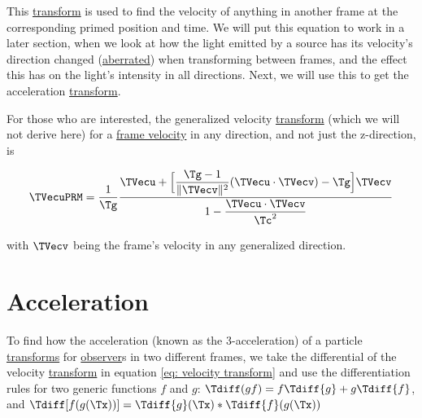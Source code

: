 This \hyperlink{def-transform}{transform} is used to find the velocity of anything in another frame at the corresponding primed position and time.
We will put this equation to work in a later section, when we look at how the light emitted by a source has its velocity's direction changed (\hyperlink{def-aberration}{aberrated}) when transforming between frames, and the effect this has on the light's intensity in all directions.
Next, we will use this to get the acceleration \hyperlink{def-transform}{transform}.

\sidenote

For those who are interested, the generalized velocity \hyperlink{def-transform}{transform} (which we will not derive here) for a \hyperlink{def-frame-velocity}{frame velocity} in any direction, and not just the z-direction, is

\begin{equation}
	\TVecuPRM  = \dfrac{1}{ \Tg  } \dfrac{\TVecu  + \Big[\dfrac{ {\Tg }-1}{\|\TVecv \|^2}(\TVecu \cdot \TVecv )-{\Tg } \Big] \TVecv  }{1-\dfrac{\TVecu \cdot\TVecv  }{ \Tc ^2} }
\end{equation}

with ${\TVecv  }$ being the frame's velocity in any generalized direction.

\section{Acceleration} \label{sect: Acceleration}

To find how the acceleration (known as the 3-acceleration) of a particle \hyperlink{def-transform}{transforms} for \hyperlink{def-observer}{observer}s in two different frames, we take the differential of the velocity \hyperlink{def-transform}{transform} in equation \eqref{eq: velocity transform} and use the differentiation rules for two generic functions ${f}$ and ${g}$: ${\Tdiff ({g}{f})} = {f} {\Tdiff {g}} + {g} {\Tdiff {f}}$, and ${\Tdiff [{ {f}({g}(\Tx ))}]} = { {\Tdiff {g}}(\Tx )} * {\Tdiff {f}({ {g}(\Tx )})}$

